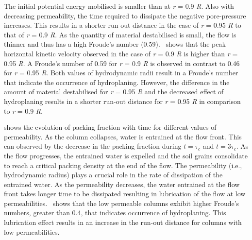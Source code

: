 \documentclass[12pt,a4paper,twocolumn,fleqn]{narms}
\begin{document}
The initial potential energy mobilised is smaller than at \textit{r} = 0.9 
\textit{R}. Also with decreasing permeability, the time required to 
dissipate the negative pore-pressure increases. This results in a shorter 
run-out distance in the case of \textit{r} = 0.95 \textit{R} to that of 
\textit{r} = 0.9 \textit{R}. As the quantity of material destabilised is small, 
the flow is thinner and thus has a high Froude's number 
(0.59).~ shows that the peak horizontal kinetic 
velocity observed in the case of \textit{r} = 0.9 \textit{R} is higher than 
\textit{r} = 0.95 \textit{R}. A Froude's number of 0.59 for \textit{r} = 0.9 
\textit{R} is observed in contrast to 0.46 for \textit{r} = 0.95 \textit{R}. 
Both values of hydrodynamic radii result in a Froude's number that indicate the 
occurrence of hydroplaning. However, the difference in the amount of material 
destabilised for \textit{r} = 0.95 \textit{R} and the decreased effect of 
hydroplaning results in a shorter run-out distance for \textit{r} = 0.95 
\textit{R} in comparison to \textit{r} = 0.9 \textit{R}.


 shows the evolution of packing 
fraction with time for different values of permeability. As the column 
collapses, water is entrained at the flow front. This can 
observed by the decrease in the packing fraction during $t = \tau_c$ and $t = 
3\tau_c$. As the flow progresses, the entrained water is expelled and the soil 
grains consolidate to reach a critical packing density at the end of the flow. 
The permeability (i.e., hydrodynamic radius) plays a crucial role in the rate 
of dissipation of the entrained water. As the permeability decreases, the water 
entrained at the flow front takes longer time to be dissipated resulting in 
lubrication of the flow at low permeabilities.~ shows 
that the low permeable columns exhibit higher Froude's numbers, greater than 
0.4, that indicates occurrence of hydroplaning. This lubrication effect results 
in an increase in the run-out distance for columns with low permeabilities.
\end{document}
